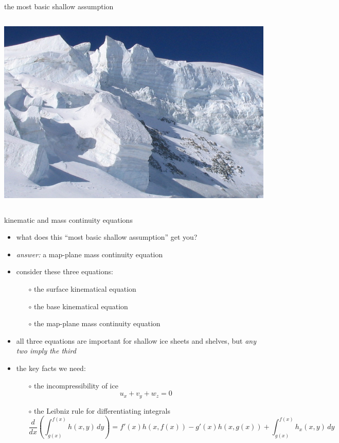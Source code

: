 \begin{frame}{the most basic shallow assumption}
\begin{columns}
\begin{column}{0.4\textwidth}
\includegraphics[width=1.0\textwidth]{photos/Serac2}
\end{column}
\end{columns}
\end{frame}


\begin{frame}{kinematic and mass continuity equations}

\begin{itemize}
\item what does this ``most basic shallow assumption'' get you?
\item \emph{answer:} a map-plane mass continuity equation
\item consider these three equations:
  \begin{itemize}
  \item[$\circ$]  the surface kinematical equation
  \item[$\circ$]  the base kinematical equation
  \item[$\circ$]  the map-plane mass continuity equation
  \end{itemize}
\item all three equations are important for shallow ice sheets and shelves, but \emph{any two imply the third}
\item the key facts we need:
  \begin{itemize}
  \item[$\circ$]  the incompressibility of ice
    $$u_x + v_y + w_z = 0$$
  \item[$\circ$]  the Leibniz rule for differentiating integrals
  \scriptsize
    $$\frac{d}{dx}\left(\int_{g(x)}^{f(x)} h(x,y)\,dy\right) = f'(x) h(x,f(x)) - g'(x) h(x,g(x)) + \int_{g(x)}^{f(x)} h_x(x,y)\,dy$$
  \end{itemize}
\end{itemize}
\end{frame}


